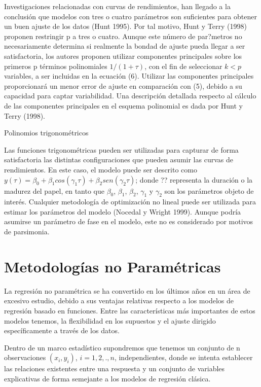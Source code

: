 \hspace*{0.4 cm}Investigaciones relacionadas con curvas de rendimientos, han llegado a
la conclusi\'on que modelos con tres o cuatro par\'ametros son suficientes
para obtener un buen ajuste de los datos (Hunt 1995). Por tal motivo,
Hunt y Terry (1998) proponen restringir p a tres o cuatro. Aunque este
n\'umero de par?metros no necesariamente determina si realmente la
bondad de ajuste pueda llegar a ser satisfactoria, los autores proponen
utilizar componentes principales sobre los primeros p t\'erminos
polinomiales $1/(1 + \tau)$, con el fin de seleccionar $k<p$ variables, a ser
incluidas en la ecuaci\'on (6). Utilizar las componentes principales
proporcionar\'a un menor error de ajuste en comparaci\'on con (5),
debido a su capacidad para captar variabilidad. Una descripci\'on
detallada respecto al c\'alculo de las componentes principales en el
esquema polinomial es dada por Hunt y Terry (1998).


Polinomios trigonom\'etricos

\hspace*{0.4 cm} Las funciones trigonom\'etricas pueden ser utilizadas para capturar de
forma satisfactoria las distintas configuraciones que pueden asumir las
curvas de rendimientos. En este caso, el modelo puede ser descrito como
$y(\tau) = \beta_{0} + \beta_{1}cos(\gamma_{1}\tau) + \beta_{2}sen(\gamma_{2}\tau)$; donde ?? representa la duraci\'on o la
madurez del papel, en tanto que $\beta_{0}$, $\beta_{1}$, $\beta_{2}$, $\gamma_{1}$ y $\gamma_{2}$ son los par\'ametros
objeto de inter\'es. Cualquier metodolog\'ia de optimizaci\'on no lineal puede
ser utilizada para estimar los par\'ametros del modelo (Nocedal y Wright
1999). Aunque podr\'ia asumirse un par\'ametro de fase en el modelo, este
no es considerado por motivos de parsimonia.

\section{Metodolog\'ias no Param\'etricas}

\hspace*{0.4 cm} La regresi\'on no param\'etrica se ha convertido en los \'ultimos a\~nos en un
\'area de excesivo estudio, debido a sus ventajas relativas respecto a los
modelos de regresi\'on basado en funciones. Entre las caracter\'isticas m\'as
importantes de estos modelos tenemos, la flexibilidad en los supuestos y
el ajuste dirigido espec\'ificamente a trav\'es de los datos.


\hspace*{0.4 cm} Dentro de un marco estad\'istico supondremos que tenemos un conjunto
de n observaciones $(x_{i}, y_{i})$, $i= 1, 2,., n$, independientes, donde se intenta
establecer las relaciones existentes entre una respuesta y un conjunto de
variables explicativas de forma semejante a los modelos de regresi\'on
cl\'asica.


